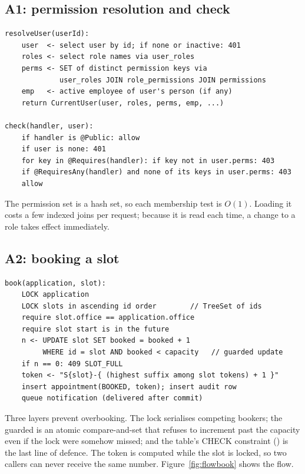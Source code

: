 \subsection{A1: permission resolution and check}
\begin{lstlisting}[language={},mathescape=false]
resolveUser(userId):
    user  <- select user by id; if none or inactive: 401
    roles <- select role names via user_roles
    perms <- SET of distinct permission keys via
             user_roles JOIN role_permissions JOIN permissions
    emp   <- active employee of user's person (if any)
    return CurrentUser(user, roles, perms, emp, ...)

check(handler, user):
    if handler is @Public: allow
    if user is none: 401
    for key in @Requires(handler): if key not in user.perms: 403
    if @RequiresAny(handler) and none of its keys in user.perms: 403
    allow
\end{lstlisting}
The permission set is a hash set, so each membership test is $O(1)$. Loading it costs a
few indexed joins per request; because it is read each time, a change to a role takes
effect immediately.

\subsection{A2: booking a slot}
\begin{lstlisting}[language={},mathescape=false]
book(application, slot):
    LOCK application
    LOCK slots in ascending id order        // TreeSet of ids
    require slot.office == application.office
    require slot start is in the future
    n <- UPDATE slot SET booked = booked + 1
         WHERE id = slot AND booked < capacity   // guarded update
    if n == 0: 409 SLOT_FULL
    token <- "S{slot}-{ (highest suffix among slot tokens) + 1 }"
    insert appointment(BOOKED, token); insert audit row
    queue notification (delivered after commit)
\end{lstlisting}
Three layers prevent overbooking. The lock serialises competing bookers; the guarded
 is an atomic compare-and-set that refuses
to increment past the capacity even if the lock were somehow missed; and the table's
CHECK constraint () is the last line of defence. The token
is computed while the slot is locked, so two callers can never receive the same number.
Figure~\ref{fig:flowbook} shows the flow.


